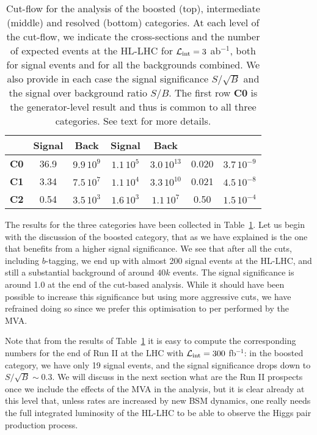 \begin{table}[t]
\begin{tabular}{c|c|c|c|c|c|c}
      &    Signal & Back   &  Signal  & Back
    &   & \\
    \hline
       {\bf C0}  &  36.9  & $9.9\,10^{9}$ & $1.1\,10^5$ & $3.0\,10^{13}$  &  0.020 & $3.7\,10^{-9}$\\
        {\bf C1}  &   3.34    & $7.5\,10^{7}$    & $1.1\,10^4$    & $3.3\,10^{10}$     & 0.021     & $4.5\,10^{-8}$  \\
        {\bf C2}  &   0.54    &  $3.5\,10^{3}$   &  $1.6\,10^{3}$   &   $1.1\,10^{7}$   & 0.50     &  $1.5\,10^{-4}$ \\
        \hline
  \end{tabular}
  \caption{\small Cut-flow for the analysis of the boosted (top),
    intermediate (middle) and resolved (bottom)
    categories.
    At each level of the cut-flow, we indicate the cross-sections and the number of
    expected events at the HL-LHC for $\mathcal{L}_{\rm int}=3$ ab$^{-1}$, both for
    signal events and for all the backgrounds combined.
    We also provide in each case the
    signal significance $S/\sqrt{B}$ and the signal
    over background ratio $S/B$.
    The first row {\bf C0} is the generator-level result and thus is common
    to all three categories.
    See text for more details.
    \label{table:cutflow}
  }
\end{table}


The results for the three categories have been collected in
Table~\ref{table:cutflow}.
%
Let us begin with the discussion of the boosted category, that as we have explained
is the one that benefits from a higher signal significance.
%
We see that after all the cuts, including $b$-tagging,
we end up with almost 200 signal events at the HL-LHC, and
still a substantial background of around $40k$ events.
%
The signal significance is around 1.0 at the end of the
cut-based analysis.
%
While it should have been possible to increase this significance
but using more aggressive cuts, we have refrained doing so
since we prefer this optimisation to per performed by
the MVA.


Note that from the results of Table~\ref{table:cutflow}
it is easy to compute the corresponding numbers
for the end of Run II at the LHC with
$\mathcal{L}_{\rm int}=300$ fb$^{-1}$: in the boosted category,
we have only
19 signal events, and the signal significance drops down to
$S/\sqrt{B}\sim 0.3$.
%
We will discuss in the next section what are the Run II prospects
once we include the effects of the MVA in the analysis, but
it is clear already at this level that, unless rates are
increased by new BSM dynamics, one really needs the full
integrated luminosity of the HL-LHC to be able to observe
the Higgs pair production process.

